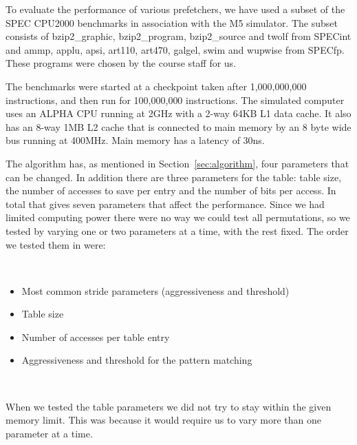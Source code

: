 To evaluate the performance of various prefetchers, we have used
a subset of the SPEC CPU2000 benchmarks in association with the M5
simulator. The subset consists of bzip2\_graphic, bzip2\_program, bzip2\_source and twolf from
SPECint and ammp, applu, apsi, art110, art470, galgel, swim and wupwise from SPECfp.
These programs were chosen by the course staff for us.

The benchmarks were started at a checkpoint taken after
1,000,000,000 instructions, and then run for 100,000,000 instructions.
The simulated computer uses an ALPHA CPU running at 2GHz
with a 2-way 64KB L1 data cache. It also has an 8-way 1MB L2 cache that is
connected to main memory by an 8 byte wide bus running at
400MHz. Main memory has a latency of 30ns.

The algorithm has, as mentioned in Section~\ref{sec:algorithm}, four parameters that can be changed. In addition there are
three parameters for the table: table size, the number of accesses to save per
entry and the number of bits per access. In total that gives seven parameters
that affect the performance. Since we had limited computing power there were no
way we could test all permutations, so we tested by varying one or two
parameters at a time, with the rest fixed. The order we tested them in were:

~
\begin{itemize}
	\item Most common stride parameters (aggressiveness and threshold)
	\item Table size
	\item Number of accesses per table entry
	\item Aggressiveness and threshold for the pattern matching
\end{itemize}
~

When we tested the table parameters we did not try to stay within the given memory limit.
This was because it would require us to vary more than one parameter at a time.
